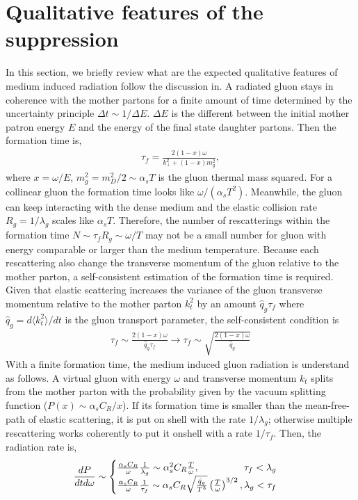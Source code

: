 \documentclass[aps, prc, reprint, amsmath, groupedaddress, nofootinbib]{revtex4-1}
\begin{document}
\section{Qualitative features of the suppression}\label{section:qual}
In this section, we briefly review what are the expected qualitative features of medium induced radiation follow the discussion in.
A radiated gluon stays in coherence with the mother partons for a finite amount of time determined by the uncertainty principle $\Delta t \sim 1/\Delta E$. 
$\Delta E$ is the different between the initial mother patron energy $E$ and the energy of the final state daughter partons.
Then the formation time is,
\begin{eqnarray}\label{eq:tau_1}
\tau_f = \frac{2(1-x)\omega}{k_\perp^2+(1-x)m_g^2},
\end{eqnarray}
where $x = \omega/E$, $m_g^2=m_D^2/2 \sim \alpha_s T$ is the gluon thermal mass squared.
For a collinear gluon the formation time looks like $\omega/(\alpha_s T^2)$.
Meanwhile, the gluon can keep interacting with the dense medium and the elastic collision rate $R_{g} = 1/\lambda_g$ scales like $\alpha_s T$. 
Therefore, the number of rescatterings within the formation time $N \sim \tau_f R_g \sim \omega/T$ may not be a small number for gluon with energy comparable or larger than the medium temperature.
Because each rescattering also change the transverse momentum of the gluon relative to the mother parton, a self-consistent estimation of the formation time is required.
Given that elastic scattering increases the variance of the gluon transverse momentum relative to the mother parton $k_t^2$ by an amount $\hat{q}_g\tau_f$ where $\hat{q}_g = d\langle k_t^2\rangle/dt$ is the gluon transport parameter, the self-consistent condition is
\begin{eqnarray}\label{eq:tau_n}
\tau_f \sim \frac{2(1-x)\omega}{\hat{q}_g\tau_f} \longrightarrow \tau_f \sim \sqrt{\frac{2(1-x)\omega}{\hat{q}_g}}
\end{eqnarray}
With a finite formation time, the medium induced gluon radiation is understand as follows. 
A virtual gluon with energy $\omega$ and transverse momentum $k_t$ splits from the mother parton with the probability given by the vacuum splitting function ($P(x) \sim \alpha_s C_R/x$).
If its formation time is smaller than the mean-free-path of elastic scattering, it is put on shell with the rate $1/\lambda_g$; otherwise multiple rescattering works coherently to put it onshell with a rate $1/\tau_f$.
Then, the radiation rate is,
\begin{eqnarray}\label{eq:LPM}
\frac{dP}{dt d\omega} \sim \begin{cases}
 \frac{\alpha_s C_R}{\omega} \frac{1}{\lambda_g} \sim \alpha_s^2 C_R \frac{T}{\omega}, \hfill \tau_f < \lambda_g\\
 \frac{\alpha_s C_R}{\omega} \frac{1}{\tau_f}\sim \alpha_s C_R \sqrt{\frac{\hat{q}_g}{T^3}} \left(\frac{T}{\omega}\right)^{3/2}, \hfill \lambda_g < \tau_f
\end{cases}
\end{eqnarray}
\end{document}

